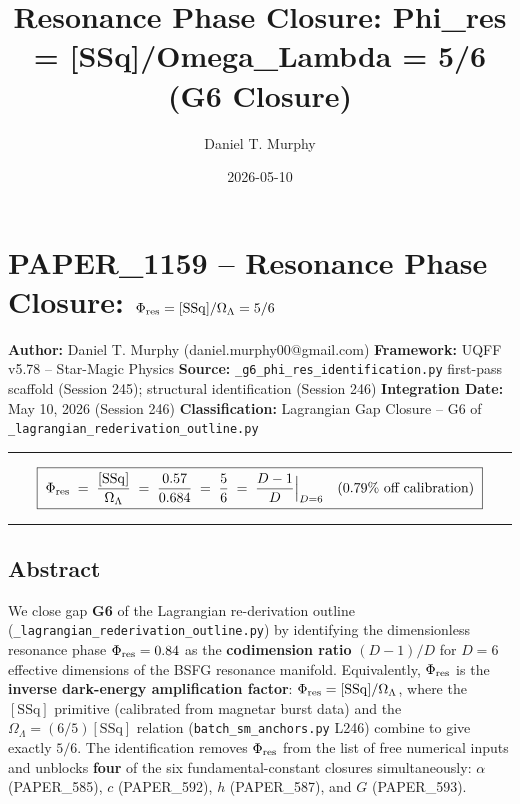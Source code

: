 \documentclass[
]{article}
\title{Resonance Phase Closure: Phi\_res = {[}SSq{]}/Omega\_Lambda = 5/6
(G6 Closure)}
\author{Daniel T. Murphy}
\date{2026-05-10}
\begin{document}
\maketitle

\section{\texorpdfstring{PAPER\_1159 -- Resonance Phase Closure:
\(\Phi_{\rm res} = [\mathrm{SSq}]/\Omega_\Lambda = 5/6\)}{PAPER\_1159 -- Resonance Phase Closure: \textbackslash Phi\_\{\textbackslash rm res\} = {[}\textbackslash mathrm\{SSq\}{]}/\textbackslash Omega\_\textbackslash Lambda = 5/6}}\label{paper_1159-resonance-phase-closure-phi_rm-res-mathrmssqomega_lambda-56}

\textbf{Author:} Daniel T. Murphy (daniel.murphy00@gmail.com)
\textbf{Framework:} UQFF v5.78 -- Star-Magic Physics \textbf{Source:}
\texttt{\_g6\_phi\_res\_identification.py} first-pass scaffold (Session
245); structural identification (Session 246) \textbf{Integration Date:}
May 10, 2026 (Session 246) \textbf{Classification:} Lagrangian Gap
Closure -- G6 of \texttt{\_lagrangian\_rederivation\_outline.py}

\begin{center}\rule{0.5\linewidth}{0.5pt}\end{center}

\[\boxed{\;\Phi_{\rm res} \;=\; \frac{[\mathrm{SSq}]}{\Omega_\Lambda} \;=\; \frac{0.57}{0.684} \;=\; \frac{5}{6} \;=\; \frac{D-1}{D}\Big|_{D=6}\quad (0.79\%\text{ off calibration})\;}\]

\begin{center}\rule{0.5\linewidth}{0.5pt}\end{center}

\subsection{Abstract}\label{abstract}

We close gap \textbf{G6} of the Lagrangian re-derivation outline
(\texttt{\_lagrangian\_rederivation\_outline.py}) by identifying the
dimensionless resonance phase \(\Phi_{\rm res} = 0.84\) as the
\textbf{codimension ratio} \((D-1)/D\) for \(D=6\) effective dimensions
of the BSFG resonance manifold. Equivalently, \(\Phi_{\rm res}\) is the
\textbf{inverse dark-energy amplification factor}:
\(\Phi_{\rm res} = [\mathrm{SSq}]/\Omega_\Lambda\), where the
\([\mathrm{SSq}]\) primitive (calibrated from magnetar burst data) and
the \(\Omega_\Lambda = (6/5)[\mathrm{SSq}]\) relation
(\texttt{batch\_sm\_anchors.py} L246) combine to give exactly \(5/6\).
The identification removes \(\Phi_{\rm res}\) from the list of free
numerical inputs and unblocks \textbf{four} of the six
fundamental-constant closures simultaneously: \(\alpha\) (PAPER\_585),
\(c\) (PAPER\_592), \(h\) (PAPER\_587), and \(G\) (PAPER\_593).
\end{document}
